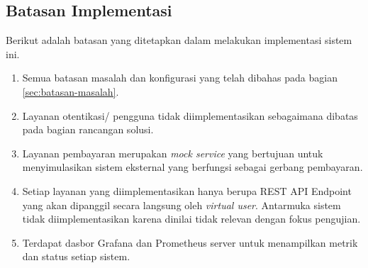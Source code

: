 \subsection{Batasan Implementasi}

Berikut adalah batasan yang ditetapkan dalam melakukan implementasi sistem ini.

\begin{enumerate}
  \item Semua batasan masalah dan konfigurasi yang telah dibahas pada bagian \ref{sec:batasan-masalah}.
  \item Layanan otentikasi/ pengguna tidak diimplementasikan sebagaimana dibatas pada bagian rancangan solusi.
  \item Layanan pembayaran merupakan \textit{mock service} yang bertujuan untuk menyimulasikan sistem eksternal yang berfungsi sebagai gerbang pembayaran.
  \item Setiap layanan yang diimplementasikan hanya berupa REST API Endpoint yang akan dipanggil secara langsung oleh \textit{virtual user}. Antarmuka sistem tidak diimplementasikan karena dinilai tidak relevan dengan fokus pengujian.
  \item Terdapat dasbor Grafana dan Prometheus server untuk menampilkan metrik dan status setiap sistem.
\end{enumerate}